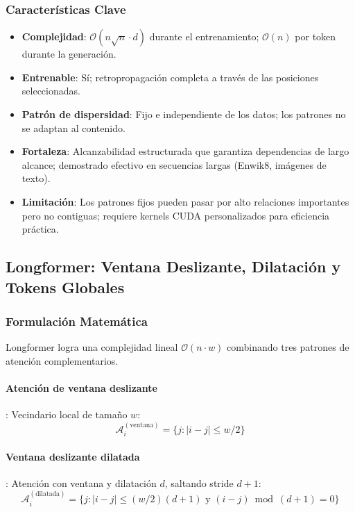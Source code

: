 \subsubsection{Características Clave}

\begin{itemize}[leftmargin=*]
    \item \textbf{Complejidad}: $\mathcal{O}(n\sqrt{n} \cdot d)$ durante el entrenamiento; $\mathcal{O}(n)$ por token durante la generación.
    \item \textbf{Entrenable}: Sí; retropropagación completa a través de las posiciones seleccionadas.
    \item \textbf{Patrón de dispersidad}: Fijo e independiente de los datos; los patrones no se adaptan al contenido.
    \item \textbf{Fortaleza}: Alcanzabilidad estructurada que garantiza dependencias de largo alcance; demostrado efectivo en secuencias largas (Enwik8, imágenes de texto).
    \item \textbf{Limitación}: Los patrones fijos pueden pasar por alto relaciones importantes pero no contiguas; requiere kernels CUDA personalizados para eficiencia práctica.
\end{itemize}

\subsection{Longformer: Ventana Deslizante, Dilatación y Tokens Globales}

\subsubsection{Formulación Matemática}

Longformer \citep{beltagy_longformer_2020} logra una complejidad lineal $\mathcal{O}(n \cdot w)$ combinando tres patrones de atención complementarios.

\paragraph{Atención de ventana deslizante}: Vecindario local de tamaño $w$:
\[
\mathcal{A}_i^{(\text{ventana})} = \{j : |i - j| \leq w/2\}
\]

\paragraph{Ventana deslizante dilatada}: Atención con ventana y dilatación $d$, saltando stride $d+1$:
\[
\mathcal{A}_i^{(\text{dilatada})} = \{j : |i - j| \leq (w/2)(d+1) \text{ y } (i-j) \bmod (d+1) = 0\}
\]

